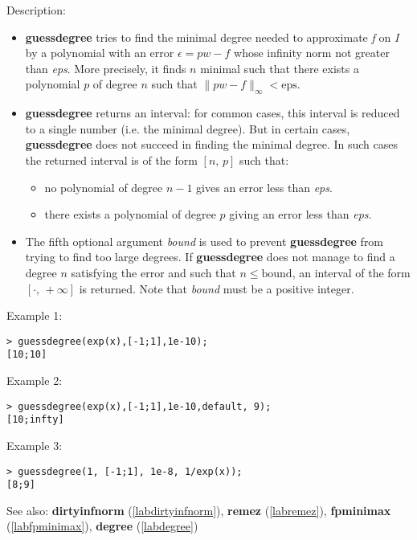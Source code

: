 \noindent Description: \begin{itemize}

\item \textbf{guessdegree} tries to find the minimal degree needed to approximate \emph{f}
   on \emph{I} by a polynomial with an error $\epsilon=p w - f$ whose infinity norm not
   greater than \emph{eps}. More precisely, it finds $n$ minimal such that there exists
   a polynomial $p$ of degree $n$ such that $\|p w-f\|_{\infty} < \mathrm{eps}$.

\item \textbf{guessdegree} returns an interval: for common cases, this interval is reduced
   to a single number (i.e. the minimal degree). But in certain cases,
   \textbf{guessdegree} does not succeed in finding the minimal degree. In such cases the
   returned interval is of the form $[n,\,p]$ such that:
   \begin{itemize}
   \item no polynomial of degree $n-1$ gives an error less than \emph{eps}.
   \item there exists a polynomial of degree $p$ giving an error less than \emph{eps}.
   \end{itemize}

\item The fifth optional argument \emph{bound} is used to prevent \textbf{guessdegree} from
   trying to find too large degrees. If \textbf{guessdegree} does not manage to find a
   degree $n$ satisfying the error and such that $n \le \textrm{bound}$, an interval of the
   form $[\cdot,\,+\infty]$ is returned. Note that \emph{bound} must be a positive integer.
\end{itemize}
\noindent Example 1: 
\begin{center}\begin{minipage}{15cm}\begin{Verbatim}[frame=single]
> guessdegree(exp(x),[-1;1],1e-10);
[10;10]
\end{Verbatim}
\end{minipage}\end{center}
\noindent Example 2: 
\begin{center}\begin{minipage}{15cm}\begin{Verbatim}[frame=single]
> guessdegree(exp(x),[-1;1],1e-10,default, 9);
[10;infty]
\end{Verbatim}
\end{minipage}\end{center}
\noindent Example 3: 
\begin{center}\begin{minipage}{15cm}\begin{Verbatim}[frame=single]
> guessdegree(1, [-1;1], 1e-8, 1/exp(x));
[8;9]
\end{Verbatim}
\end{minipage}\end{center}
See also: \textbf{dirtyinfnorm} (\ref{labdirtyinfnorm}), \textbf{remez} (\ref{labremez}), \textbf{fpminimax} (\ref{labfpminimax}), \textbf{degree} (\ref{labdegree})
